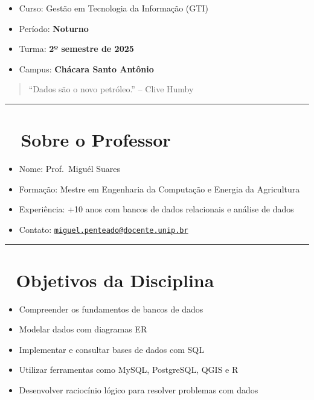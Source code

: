 \documentclass[
]{book}
\providecommand{\tightlist}{%
  \setlength{\itemsep}{0pt}\setlength{\parskip}{0pt}}
\begin{document}
\begin{itemize}
\tightlist
\item
  Curso: Gestão em Tecnologia da Informação (GTI)\\
\item
  Período: \textbf{Noturno}\\
\item
  Turma: \textbf{2º semestre de 2025}
\item
  Campus: \textbf{Chácara Santo Antônio}
\end{itemize}

\begin{quote}
``Dados são o novo petróleo.'' -- Clive Humby
\end{quote}

\begin{center}\rule{0.5\linewidth}{0.5pt}\end{center}

\chapter{👨‍🏫 Sobre o Professor}\label{sobre-o-professor}

\begin{itemize}
\tightlist
\item
  Nome: Prof.~Miguél Suares
\item
  Formação: Mestre em Engenharia da Computação e Energia da Agricultura
\item
  Experiência: +10 anos com bancos de dados relacionais e análise de dados
\item
  Contato: \href{mailto:miguel.penteado@docente.unip.br}{\nolinkurl{miguel.penteado@docente.unip.br}}
\end{itemize}

\begin{center}\rule{0.5\linewidth}{0.5pt}\end{center}

\chapter{🎯 Objetivos da Disciplina}\label{objetivos-da-disciplina}

\begin{itemize}
\tightlist
\item
  Compreender os fundamentos de bancos de dados
\item
  Modelar dados com diagramas ER
\item
  Implementar e consultar bases de dados com SQL
\item
  Utilizar ferramentas como MySQL, PostgreSQL, QGIS e R
\item
  Desenvolver raciocínio lógico para resolver problemas com dados
\end{itemize}
\end{document}

